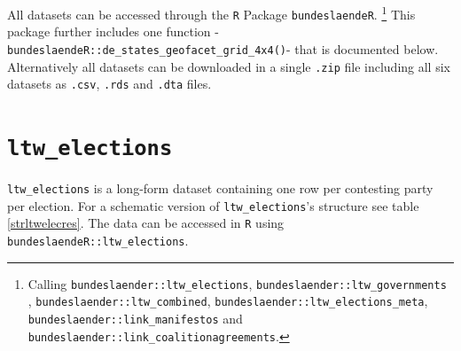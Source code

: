 \documentclass[
  a4paper,
  DIV=11,
  numbers=noendperiod]{scrartcl}
\begin{document}
All datasets can be accessed through the \texttt{R} Package
\texttt{bundeslaendeR}.
\footnote{Calling \texttt{bundeslaender::ltw\_elections}, \texttt{bundeslaender::ltw\_governments} , \texttt{bundeslaender::ltw\_combined},
\texttt{bundeslaender::ltw\_elections\_meta}, \texttt{bundeslaender::link\_manifestos} and \texttt{bundeslaender::link\_coalitionagreements}.}
This package further includes one function
-\texttt{bundeslaendeR::de\_states\_geofacet\_grid\_4x4()}- that is
documented below. Alternatively all datasets can be downloaded in a
single \texttt{.zip} file including all six datasets as \texttt{.csv},
\texttt{.rds} and \texttt{.dta} files.

\newpage

\section{\texorpdfstring{\texttt{ltw\_elections}}{ltw\_elections}}\label{ltw_elections}

\texttt{ltw\_elections} is a long-form dataset containing one row per
contesting party per election. For a schematic version of
\texttt{ltw\_elections}'s structure see table\(~\)\ref{strltwelecres}.
The data can be accessed in \texttt{R} using
\texttt{bundeslaendeR::ltw\_elections}.
\end{document}
